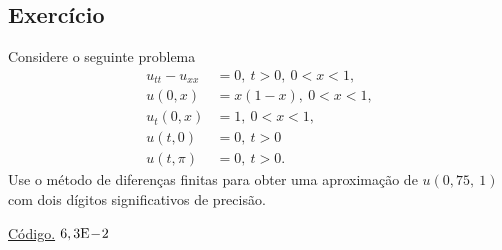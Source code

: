 \subsection*{Exercício}

\begin{exer}
  Considere o seguinte problema
  \begin{align}
    u_{tt} - u_{xx} &= 0,~t>0,~0< x < 1,\\
    u(0,x) &= x(1-x),~0<x<1,\\
    u_t(0,x) &= 1,~0<x<1,\\
    u(t,0) &= 0,~t>0\\
    u(t,\pi) &= 0,~t>0.
  \end{align}
Use o método de diferenças finitas para obter uma aproximação de $u(0,75,~1)$ com dois dígitos significativos de precisão.
\end{exer}
\begin{resp}
  \ifisoctave 
  \href{https://github.com/phkonzen/notas/blob/master/src/MatematicaNumerica/cap_edp/dados/exer_edp_onda_1/exer_edp_onda_1.m}{Código.} 
  \fi
  $6,3\mathrm{E}\!-\!2$
\end{resp}